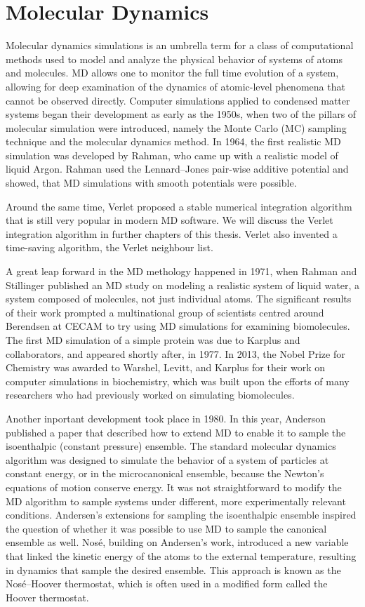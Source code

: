 \chapter{Molecular Dynamics}

Molecular dynamics simulations is an umbrella term for a class of
computational methods used to model and analyze the physical behavior of
systems of atoms and molecules. MD allows one to monitor the full time
evolution of a system, allowing for deep examination of the dynamics of
atomic-level phenomena that cannot be observed directly.
Computer simulations applied to condensed matter systems began their
development as early as the 1950s, when two of the pillars of molecular
simulation were introduced, namely the Monte Carlo (MC) sampling technique and
the molecular dynamics method. In 1964, the first realistic MD simulation was
developed by Rahman, who came up with a realistic model of liquid Argon.
Rahman used the Lennard–Jones pair-wise additive potential and showed, that
MD simulations with smooth potentials were possible.

Around the same time, Verlet proposed a stable numerical integration
algorithm that is still very popular in modern MD software. We will discuss
the Verlet integration algorithm in further chapters of this thesis. Verlet
also invented a time-saving algorithm, the Verlet neighbour list.

A great leap forward in the MD methology happened in 1971, when Rahman and
Stillinger published an MD study on modeling a realistic system of liquid
water, a system composed of molecules, not just individual atoms. The
significant results of their work prompted a multinational group of scientists
centred around Berendsen at CECAM to try using MD simulations for examining
biomolecules. The first MD simulation of a simple protein was due to Karplus
and collaborators, and appeared shortly after, in 1977. In 2013, the Nobel
Prize for Chemistry was awarded to Warshel, Levitt, and Karplus for their work
on computer simulations in biochemistry, which was built upon the efforts of
many researchers who had previously worked on simulating biomolecules.

Another inportant development took place in 1980. In this year, Anderson
published a paper that described how to extend MD to enable it to sample the
isoenthalpic (constant pressure) ensemble. The standard molecular dynamics
algorithm was designed to simulate the behavior of a system of particles at
constant energy, or in the microcanonical ensemble, because the Newton's
equations of motion conserve energy. It was not straightforward to modify the
MD algorithm to sample systems under different, more experimentally relevant
conditions. Andersen's extensions for sampling the isoenthalpic ensemble
inspired the question of whether it was possible to use MD to sample the
canonical ensemble as well. Nosé, building on Andersen's work, introduced a
new variable that linked the kinetic energy of the atoms to the external
temperature, resulting in dynamics that sample the desired ensemble. This
approach is known as the Nosé–Hoover thermostat, which is often used in a
modified form called the Hoover thermostat.

